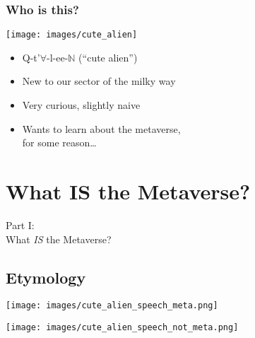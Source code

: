 \documentclass[aspectratio=169,x11names]{beamer}
\begin{document}
\begin{frame}
\frametitle{Who is this?}
\begin{minipage}{0.45\textwidth}
\begin{center}
\texttt{[image: images/cute\_alien]} 
\end{center}
\end{minipage}%
\hfill\pause
\begin{minipage}{0.55\textwidth}
\begin{itemize}
\item Q-t'$\forall$-l-ee-$\mathbb{N}$ (``cute alien'')
\item New to our sector of the milky way
\item Very curious, slightly naive
\item Wants to learn about the metaverse,\\ for some reason\dots
\end{itemize}
\end{minipage}
\end{frame}

\section{What IS the Metaverse?}

\begin{frame}
\begin{center}
\Large
Part I:\bigskip\\
\huge
What \emph{IS} the Metaverse?
\end{center}
\end{frame}

\subsection{Etymology}

\begin{frame}
\begin{center}
\texttt{[image: images/cute\_alien\_speech\_meta.png]} 
\end{center}
\end{frame}

\begin{frame}
\begin{center}
\texttt{[image: images/cute\_alien\_speech\_not\_meta.png]} 
\end{center}
\end{frame}
\end{document}
